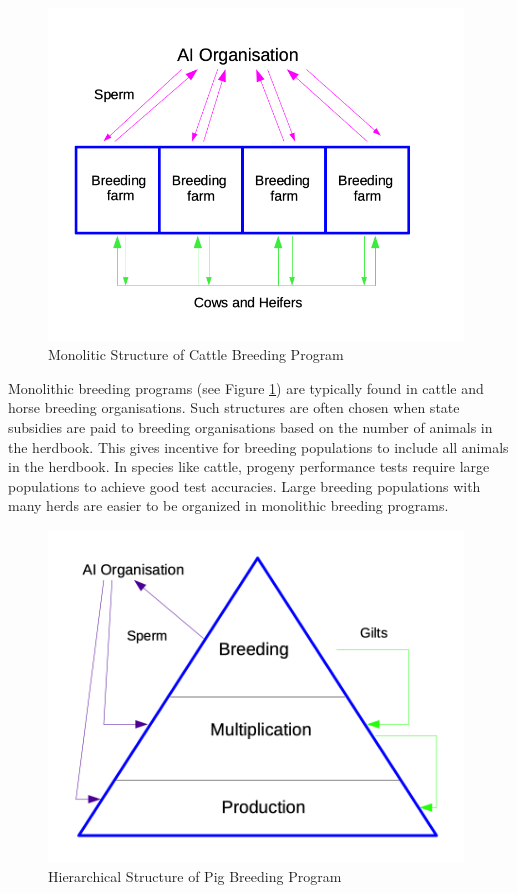 \documentclass[
]{book}
\begin{document}
\begin{figure}
\includegraphics[width=11cm]{odg/monoliticbreedingprogram} \caption{Monolitic Structure of Cattle Breeding Program}\label{fig:monoliticbreedingprogram}
\end{figure}

Monolithic breeding programs (see Figure \ref{fig:monoliticbreedingprogram}) are typically found in cattle and horse breeding organisations. Such structures are often chosen when state subsidies are paid to breeding organisations based on the number of animals in the herdbook. This gives incentive for breeding populations to include all animals in the herdbook. In species like cattle, progeny performance tests require large populations to achieve good test accuracies. Large breeding populations with many herds are easier to be organized in monolithic breeding programs.

\begin{figure}
\includegraphics[width=11cm]{odg/hierarchicalbreedingprogram} \caption{Hierarchical Structure of Pig Breeding Program}\label{fig:hierarchicalbreedingprogram}
\end{figure}
\end{document}
